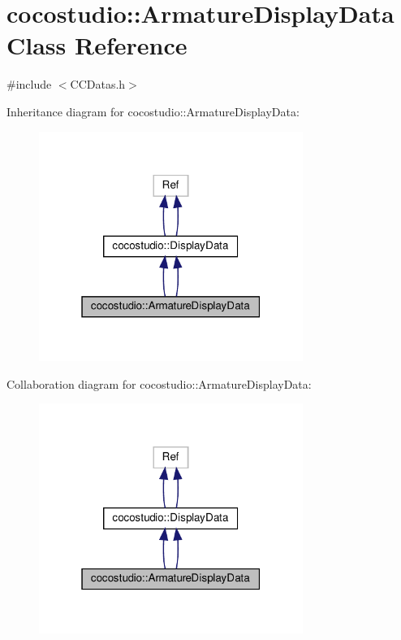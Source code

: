 \hypertarget{classcocostudio_1_1ArmatureDisplayData}{}\section{cocostudio\+:\+:Armature\+Display\+Data Class Reference}
\label{classcocostudio_1_1ArmatureDisplayData}


{\ttfamily \#include $<$C\+C\+Datas.\+h$>$}



Inheritance diagram for cocostudio\+:\+:Armature\+Display\+Data\+:
\nopagebreak
\begin{figure}[H]
\begin{center}
\leavevmode
\includegraphics[width=244pt]{classcocostudio_1_1ArmatureDisplayData__inherit__graph}
\end{center}
\end{figure}


Collaboration diagram for cocostudio\+:\+:Armature\+Display\+Data\+:
\nopagebreak
\begin{figure}[H]
\begin{center}
\leavevmode
\includegraphics[width=244pt]{classcocostudio_1_1ArmatureDisplayData__coll__graph}
\end{center}
\end{figure}
